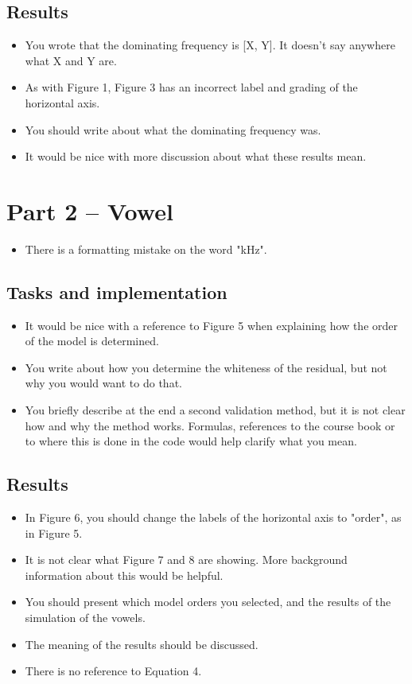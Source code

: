 \documentclass[a4paper]{article}
\begin{document}
\subsection{Results}
\begin{itemize}
    \item You wrote that the dominating frequency is [X, Y]. It doesn't
        say anywhere what X and Y are.
    \item As with Figure 1, Figure 3 has an incorrect label and grading of the horizontal axis.
    \item You should write about what the dominating frequency was.
    \item It would be nice with more discussion about what these results mean.
\end{itemize}

\section{Part 2 -- Vowel}

\begin{itemize}
    \item There is a formatting mistake on the word "kHz".
\end{itemize}

\subsection{Tasks and implementation}

\begin{itemize}
    \item It would be nice with a reference to Figure 5 when explaining how the
    order of the model is determined.
    \item You write about how you determine the whiteness of the residual, but
        not why you would want to do that.
    \item You briefly describe at the end a second validation method, but it
        is not clear how and why the method works. Formulas, references to the
        course book or to where this is done in the code would help clarify
        what you mean.
\end{itemize}

\subsection{Results}

\begin{itemize}
    \item In Figure 6, you should change the labels of the
        horizontal axis to "order", as in Figure 5.
    \item It is not clear what Figure 7 and 8 are showing. 
        More background information about this would be helpful.
    \item You should present which model orders you selected, and
        the results of the simulation of the vowels.
    \item The meaning of the results should be discussed.
    \item There is no reference to Equation 4.
\end{itemize}
\end{document}
